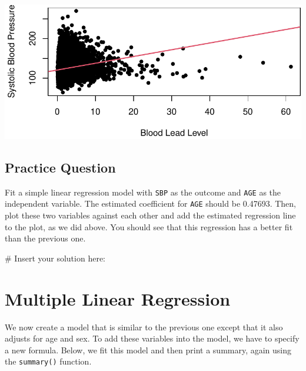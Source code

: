 \documentclass[
  letterpaper,
]{krantz}
\makeatletter
\newenvironment{Shaded}{\begin{snugshade}}{\end{snugshade}}
\newcommand{\CommentTok}[1]{\textcolor[rgb]{0.37,0.37,0.37}{#1}}
\newenvironment{kframe}{%
\medskip{}
\setlength{\fboxsep}{.8em}
 \def\at@end@of@kframe{}%
 \ifinner\ifhmode%
  \def\at@end@of@kframe{\end{minipage}}%
  \begin{minipage}{\columnwidth}%
 \fi\fi%
 \def\FrameCommand##1{\hskip\@totalleftmargin \hskip-\fboxsep
 \colorbox{shadecolor}{##1}\hskip-\fboxsep
     \hskip-\linewidth \hskip-\@totalleftmargin \hskip\columnwidth}%
 \MakeFramed {\advance\hsize-\width
   \@totalleftmargin\z@ \linewidth\hsize
   \@setminipage}}%
 {\par\unskip\endMakeFramed%
 \at@end@of@kframe}
\renewenvironment{Shaded}{\begin{kframe}}{\end{kframe}}
\makeatother
\begin{document}
\begin{center}
\includegraphics[width=1\textwidth,height=\textheight]{book/linear_regression_files/figure-pdf/unnamed-chunk-6-1.pdf}
\end{center}

\subsection{Practice Question}\label{practice-question-20}

Fit a simple linear regression model with \texttt{SBP} as the outcome
and \texttt{AGE} as the independent variable. The estimated coefficient
for \texttt{AGE} should be 0.47693. Then, plot these two variables
against each other and add the estimated regression line to the plot, as
we did above. You should see that this regression has a better fit than
the previous one.

\begin{Shaded}
\begin{Highlighting}[]
\CommentTok{\# Insert your solution here:}
\end{Highlighting}
\end{Shaded}

\section{Multiple Linear Regression}\label{multiple-linear-regression}

We now create a model that is similar to the previous one except that it
also adjusts for age and sex. To add these variables into the model, we
have to specify a new formula. Below, we fit this model and then print a
summary, again using the \texttt{summary()} function.
\end{document}
